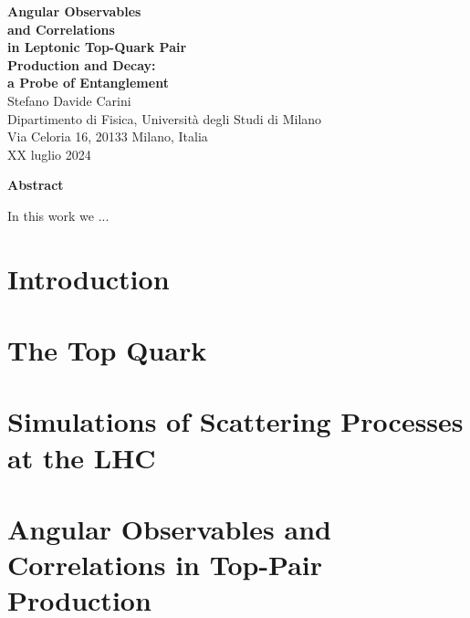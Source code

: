 \documentclass[12pt,a4paper, openright, twoside]{report}
\begin{document}
\newpage
\mbox{}
\thispagestyle{empty}
\newpage
\thispagestyle{empty}
\begin{center}
    {\Huge \textbf{Angular Observables}} \\
    {\Huge \textbf{and Correlations}} \\
    {\Huge \textbf{in Leptonic Top-Quark Pair}} \\
    {\Huge \textbf{Production and Decay:}} \\
    {\Huge \textbf{a Probe of Entanglement}} \\ [1cm]
    
    \large Stefano Davide Carini \\ 
    Dipartimento di Fisica, Università degli Studi di Milano\\
    Via Celoria 16, 20133 Milano, Italia\\
    XX luglio 2024
        \vspace{1.8cm}
    
    \begin{singlespace}
        \normalsize \textbf{Abstract}
        \\
        \begin{adjustwidth}{12mm}{12mm}
            \normalsize
            \noindent In this work we ...
        \end{adjustwidth}
        
        \vspace{1cm} 
    \end{singlespace}
\end{center}


\newpage
\tableofcontents
\thispagestyle{empty}

\chapter{Introduction} \label{introduction}

\chapter{The Top Quark} 

\newpage
\chapter{Simulations of Scattering Processes at the LHC}

\newpage
\chapter{Angular Observables and Correlations in Top-Pair Production}

\newpage
\end{document}
